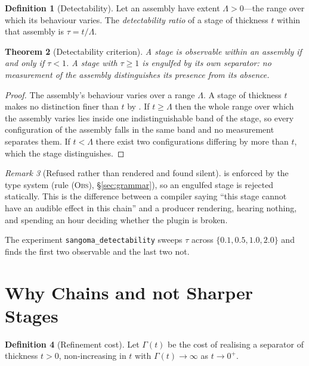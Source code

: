 \documentclass[11pt,twocolumn,a4paper]{article}
\newtheorem{theorem}{Theorem}[section]
\theoremstyle{definition}
\newtheorem{definition}[theorem]{Definition}
\theoremstyle{remark}
\newtheorem{remark}[theorem]{Remark}
\newcommand{\thick}{t}
\begin{document}
\begin{definition}[Detectability]
\label{def:detect}
Let an assembly have extent $\Lambda>0$---the range over which its behaviour
varies. The \emph{detectability ratio} of a stage of thickness $\thick$ within
that assembly is $\tau = \thick/\Lambda$.
\end{definition}

\begin{theorem}[Detectability criterion]
\label{thm:detect}
A stage is observable within an assembly if and only if $\tau<1$. A stage with
$\tau\ge1$ is engulfed by its own separator: no measurement of the assembly
distinguishes its presence from its absence.
\end{theorem}

\begin{proof}
The assembly's behaviour varies over a range $\Lambda$. A stage of thickness
$\thick$ makes no distinction finer than $\thick$ by . If
$\thick\ge\Lambda$ then the whole range over which the assembly varies lies
inside one indistinguishable band of the stage, so every configuration of the
assembly falls in the same band and no measurement separates them. If
$\thick<\Lambda$ there exist two configurations differing by more than $\thick$,
which the stage distinguishes.
\end{proof}

\begin{remark}[Refused rather than rendered and found silent]
\label{rem:refuse-silent}
 is enforced by the type system (rule \textsc{(Obs)},
\S\ref{sec:grammar}), so an engulfed stage is rejected statically. This is the
difference between a compiler saying ``this stage cannot have an audible effect
in this chain'' and a producer rendering, hearing nothing, and spending an hour
deciding whether the plugin is broken.
\end{remark}

The experiment \texttt{sangoma\_detectability} sweeps $\tau$ across
$\{0.1,0.5,1.0,2.0\}$ and finds the first two observable and the last two not.

\section{Why Chains and not Sharper Stages}
\label{sec:composition}

\begin{definition}[Refinement cost]
\label{def:refinecost}
Let $\Gamma(\thick)$ be the cost of realising a separator of thickness $\thick>0$,
non-increasing in $\thick$ with $\Gamma(\thick)\to\infty$ as $\thick\to0^{+}$.
\end{definition}
\end{document}
